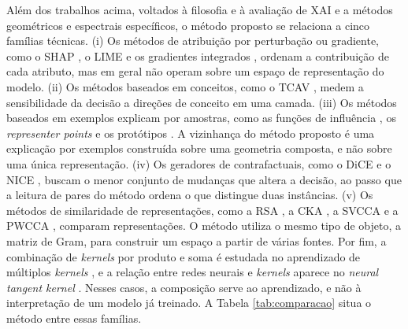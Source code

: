 Além dos trabalhos acima, voltados à filosofia e à avaliação de XAI e a métodos geométricos e espectrais específicos, o método proposto se relaciona a cinco famílias técnicas. (i) Os métodos de atribuição por perturbação ou gradiente, como o SHAP \citep{LundbergLee2017}, o LIME \citep{Ribeiro2016} e os gradientes integrados \citep{Sundararajan2017}, ordenam a contribuição de cada atributo, mas em geral não operam sobre um espaço de representação do modelo. (ii) Os métodos baseados em conceitos, como o TCAV \citep{Kim2018}, medem a sensibilidade da decisão a direções de conceito em uma camada. (iii) Os métodos baseados em exemplos explicam por amostras, como as funções de influência \citep{Koh2017}, os \textit{representer points} \citep{Yeh2018} e os protótipos \citep{Chen2019}. A vizinhança do método proposto é uma explicação por exemplos construída sobre uma geometria composta, e não sobre uma única representação. (iv) Os geradores de contrafactuais, como o DiCE \citep{Mothilal2020} e o NICE \citep{Brughmans2024}, buscam o menor conjunto de mudanças que altera a decisão, ao passo que a leitura de pares do método ordena o que distingue duas instâncias. (v) Os métodos de similaridade de representações, como a RSA \citep{Kriegeskorte2008}, a CKA \citep{Kornblith2019}, a SVCCA \citep{Raghu2017} e a PWCCA \citep{Morcos2018}, comparam representações. O método utiliza o mesmo tipo de objeto, a matriz de Gram, para construir um espaço a partir de várias fontes. Por fim, a combinação de \textit{kernels} por produto e soma é estudada no aprendizado de múltiplos \textit{kernels} \citep{Gonen2011}, e a relação entre redes neurais e \textit{kernels} aparece no \textit{neural tangent kernel} \citep{Jacot2018}. Nesses casos, a composição serve ao aprendizado, e não à interpretação de um modelo já treinado. A Tabela \ref{tab:comparacao} situa o método entre essas famílias.

